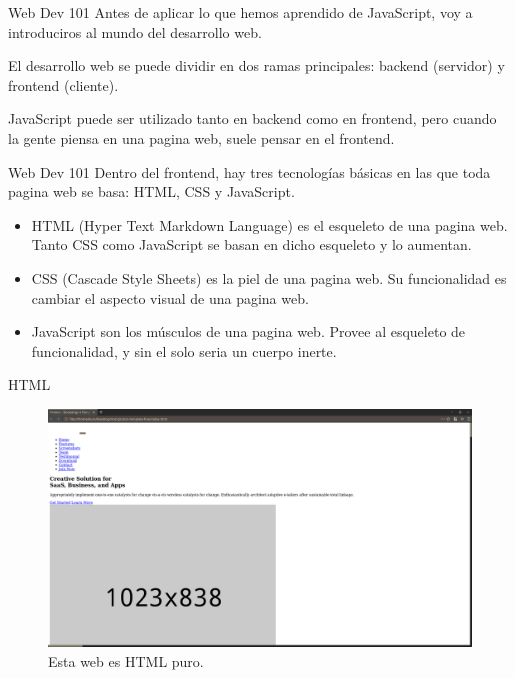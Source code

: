 \documentclass{beamer}
\begin{document}
\begin{frame}{Web Dev 101}
Antes de aplicar lo que hemos aprendido de JavaScript, voy a introduciros al mundo del desarrollo web. \pause

El desarrollo web se puede dividir en dos ramas principales: backend (servidor) y frontend (cliente). \pause

JavaScript puede ser utilizado tanto en backend como en frontend, pero cuando la gente piensa en una pagina web, suele pensar en el frontend.
    
\end{frame}

\begin{frame}{Web Dev 101}
Dentro del frontend, hay tres tecnologías básicas en las que toda pagina web se basa: HTML, CSS y JavaScript. \pause
\begin{itemize}
    \item HTML (Hyper Text Markdown Language) es el esqueleto de una pagina web. Tanto CSS como JavaScript se basan en dicho esqueleto y lo aumentan. \pause
    \item CSS (Cascade Style Sheets) es la piel de una pagina web. Su funcionalidad es cambiar el aspecto visual de una pagina web. \pause
    \item JavaScript son los músculos de una pagina web. Provee al esqueleto de funcionalidad, y sin el solo seria un cuerpo inerte.
\end{itemize}
\end{frame}

\begin{frame}{HTML}
\begin{figure}
    \centering
    \includegraphics[width=\textwidth]{images/nocss.png}
    \caption{Esta web es HTML puro.}
\end{figure}
\end{frame}
\end{document}
